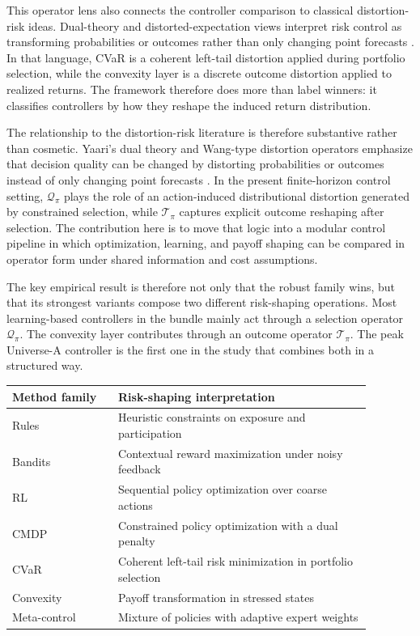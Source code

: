 \documentclass[10pt,twocolumn]{article}
\begin{document}
This operator lens also connects the controller comparison to classical
distortion-risk ideas. Dual-theory and distorted-expectation views interpret
risk control as transforming probabilities or outcomes rather than only
changing point forecasts \cite{yaari1987,schmeidler1989,wang2000}. In that
language, CVaR is a coherent left-tail distortion applied during portfolio
selection, while the convexity layer is a discrete outcome distortion applied
to realized returns. The framework therefore does more than label winners: it
classifies controllers by how they reshape the induced return distribution.

The relationship to the distortion-risk literature is therefore substantive
rather than cosmetic. Yaari's dual theory and Wang-type distortion operators
emphasize that decision quality can be changed by distorting probabilities or
outcomes instead of only changing point forecasts \cite{yaari1987,wang2000}. In
the present finite-horizon control setting, $\mathcal{Q}_{\pi}$ plays the role
of an action-induced distributional distortion generated by constrained
selection, while $\mathcal{T}_{\pi}$ captures explicit outcome reshaping after
selection. The contribution here is to move that logic into a modular control
pipeline in which optimization, learning, and payoff shaping can be compared in
operator form under shared information and cost assumptions.

The key empirical result is therefore not only that the robust family wins, but
that its strongest variants compose two different risk-shaping operations. Most
learning-based controllers in the bundle mainly act through a selection
operator $\mathcal{Q}_\pi$. The convexity layer contributes through an outcome
operator $\mathcal{T}_\pi$. The peak Universe-A controller is the first one in
the study that combines both in a structured way.

\begin{center}
\small
\begin{tabular}{@{} p{0.26\linewidth} p{0.62\linewidth} @{}}
\toprule
\textbf{Method family} & \textbf{Risk-shaping interpretation} \\
\midrule
Rules & Heuristic constraints on exposure and participation \\
Bandits & Contextual reward maximization under noisy feedback \\
RL & Sequential policy optimization over coarse actions \\
CMDP & Constrained policy optimization with a dual penalty \\
CVaR & Coherent left-tail risk minimization in portfolio selection \\
Convexity & Payoff transformation in stressed states \\
Meta-control & Mixture of policies with adaptive expert weights \\
\bottomrule
\end{tabular}
\end{center}
\end{document}
